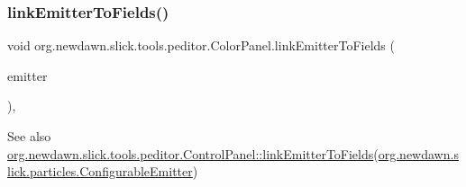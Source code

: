 \subsubsection{\texorpdfstring{link\+Emitter\+To\+Fields()}{linkEmitterToFields()}}
{\footnotesize\ttfamily void org.\+newdawn.\+slick.\+tools.\+peditor.\+Color\+Panel.\+link\+Emitter\+To\+Fields (\begin{DoxyParamCaption}\item[{\mbox{\hyperlink{classorg_1_1newdawn_1_1slick_1_1particles_1_1_configurable_emitter}{Configurable\+Emitter}}}]{emitter }\end{DoxyParamCaption})\hspace{0.3cm}{\ttfamily [inline]}, {\ttfamily [protected]}}

\begin{DoxySeeAlso}{See also}
\mbox{\hyperlink{classorg_1_1newdawn_1_1slick_1_1tools_1_1peditor_1_1_control_panel_a55fa468548caadc265ea28c5f3214a20}{org.\+newdawn.\+slick.\+tools.\+peditor.\+Control\+Panel\+::link\+Emitter\+To\+Fields}}(\mbox{\hyperlink{classorg_1_1newdawn_1_1slick_1_1particles_1_1_configurable_emitter}{org.\+newdawn.\+slick.\+particles.\+Configurable\+Emitter}}) 
\end{DoxySeeAlso}

